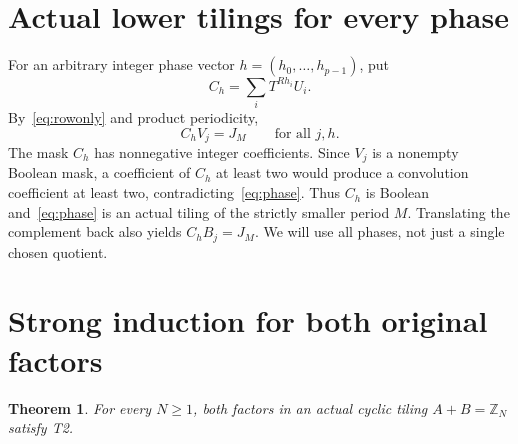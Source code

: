 \documentclass[10pt,a4paper]{amsart}
\newtheorem{theorem}{Theorem}
\newcommand{\Z}{\mathbb Z}
\begin{document}
\section{Actual lower tilings for every phase}\label{sec:phases}
For an arbitrary integer phase vector $h=(h_0,\ldots,h_{p-1})$, put
\[
 C_h=\sum_i T^{Rh_i}U_i.
\]
By~\eqref{eq:rowonly} and product periodicity,
\begin{equation}\label{eq:phase}
 C_hV_j=J_M\qquad\text{for all }j,h.
\end{equation}
The mask $C_h$ has nonnegative integer coefficients. Since $V_j$ is a nonempty Boolean mask, a coefficient of $C_h$ at least two would produce a convolution coefficient at least two, contradicting~\eqref{eq:phase}. Thus $C_h$ is Boolean and~\eqref{eq:phase} is an actual tiling of the strictly smaller period $M$. Translating the complement back also yields $C_hB_j=J_M$. We will use all phases, not just a single chosen quotient.

\section{Strong induction for both original factors}

\begin{theorem}\label{thm:cyclic}
For every $N\ge1$, both factors in an actual cyclic tiling $A+B=\Z_N$ satisfy T2.
\end{theorem}
\end{document}
